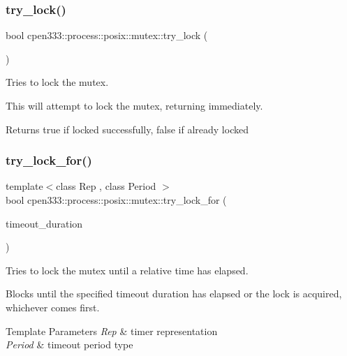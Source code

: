 \subsubsection{\texorpdfstring{try\+\_\+lock()}{try\_lock()}}
{\footnotesize\ttfamily bool cpen333\+::process\+::posix\+::mutex\+::try\+\_\+lock (\begin{DoxyParamCaption}{ }\end{DoxyParamCaption})\hspace{0.3cm}{\ttfamily [inline]}}



Tries to lock the mutex. 

This will attempt to lock the mutex, returning immediately.

\begin{DoxyReturn}{Returns}
true if locked successfully, false if already locked 
\end{DoxyReturn}
\mbox{\label{classcpen333_1_1process_1_1posix_1_1mutex_a28ac1db650efaae2d959df0e555f3d24}} 
\subsubsection{\texorpdfstring{try\+\_\+lock\+\_\+for()}{try\_lock\_for()}}
{\footnotesize\ttfamily template$<$class Rep , class Period $>$ \\
bool cpen333\+::process\+::posix\+::mutex\+::try\+\_\+lock\+\_\+for (\begin{DoxyParamCaption}\item[{const std\+::chrono\+::duration$<$ Rep, Period $>$ \&}]{timeout\+\_\+duration }\end{DoxyParamCaption})\hspace{0.3cm}{\ttfamily [inline]}}



Tries to lock the mutex until a relative time has elapsed. 

Blocks until the specified timeout duration has elapsed or the lock is acquired, whichever comes first.


\begin{DoxyTemplParams}{Template Parameters}
{\em Rep} & timer representation \\
\hline
{\em Period} & timeout period type \\
\hline
\end{DoxyTemplParams}


